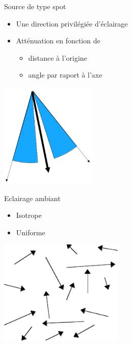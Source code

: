 \begin{frame}[t]{Source de type spot}
  \begin{itemize}
    \item Une direction privilégiée d'éclairage
    \item Atténuation en fonction de
    \begin{itemize}
      \item distance à l'origine
      \item angle par raport à l'axe
    \end{itemize}
  \end{itemize}
    \begin{center}
      \includegraphics[height=5cm]{figs/src-spot.pdf}
      \end{center}
\end{frame}

\begin{frame}[t]{Eclairage ambiant}
  \begin{itemize}
    \item Isotrope
    \item Uniforme
  \end{itemize}
    \begin{center}
      \includegraphics[height=5cm]{figs/src-ambiant.pdf}
      \end{center}
\end{frame}


